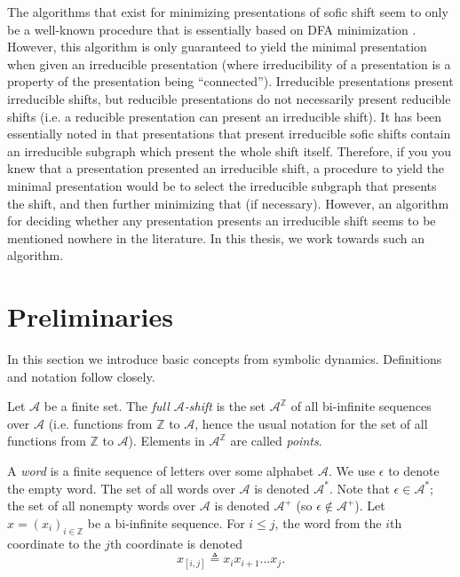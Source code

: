 \documentclass[hidelinks]{report}
\newcommand{\Ac}{\mathcal{A}}  %
\newcommand{\term}[1]{\textit{#1}}
\theoremstyle{definition}
\begin{document}
The algorithms that exist for minimizing presentations of sofic shift 
seem to only be a well-known procedure that is essentially 
based on DFA minimization \cite{hopcroft2001introduction,lind1995introduction}. 
However, this algorithm is only guaranteed to yield the minimal presentation when 
given an irreducible presentation (where irreducibility of a presentation is a property
of the presentation being ``connected'').
Irreducible presentations present irreducible shifts, but reducible presentations do not 
necessarily present reducible shifts (i.e. a reducible presentation can present 
an irreducible shift). It 
has been essentially noted in \cite{jonoska1996sofic,marcus1991bounds,jonoska1994minimal} 
that presentations that present irreducible sofic shifts contain an irreducible subgraph 
which present the whole shift itself. Therefore, if you you 
knew that a presentation presented an irreducible shift, a procedure
to yield the minimal presentation would be to select the irreducible subgraph 
that presents the shift, and then further minimizing that (if necessary). However, 
an algorithm for deciding whether any presentation presents an irreducible shift 
seems to be mentioned nowhere in the literature. In this thesis, we work towards such an algorithm.


\chapter{Preliminaries}

In this section we introduce basic concepts from symbolic dynamics. 
Definitions and notation follow \cite{lind1995introduction} closely.

\begin{definition}
    Let \(\Ac\) be a finite set. The \term{full \(\Ac\)-shift} is the set \(\Ac^\mathbb{Z}\) of all 
    bi-infinite sequences over \(\Ac\) (i.e. functions from \(\mathbb{Z}\) to \(\Ac\), hence the 
    usual notation for the set of all functions from \(\mathbb{Z}\) to \(\Ac\)).
    Elements in \(\Ac^\mathbb{Z}\) are called \term{points}.
\end{definition}

A \term{word} is a finite sequence of letters over some alphabet \(\Ac\). We use 
\(\epsilon\) to denote the empty word. The set of all words over \(\Ac\) 
is denoted \(\Ac^*\). Note that \(\epsilon \in \Ac^*\); the set of all 
nonempty words over \(\Ac\) is denoted \(\Ac^+\) (so \(\epsilon \notin \Ac^+\)).
Let \(x=(x_i)_{i \in \mathbb{Z}}\) be a bi-infinite sequence. For \(i \leq j\), the word from the 
\(i\)th coordinate to the \(j\)th coordinate is denoted \[x_{[i,j]} \triangleq x_i x_{i+1} \dots x_{j}.\]
\end{document}
